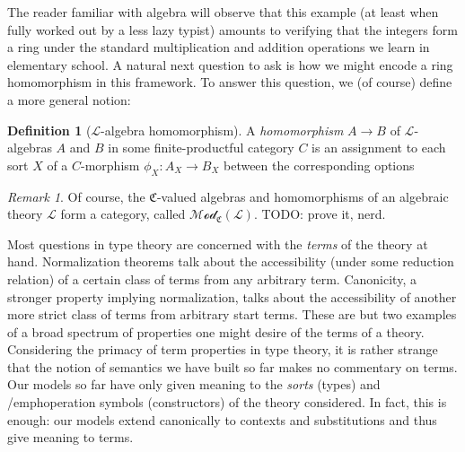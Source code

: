 \documentclass[12pt,twoside]{reedthesis}
\theoremstyle{definition}
\newtheorem{definition}{Definition}
\theoremstyle{remark}
\newtheorem{remark}{Remark}
\theoremstyle{plain}
\begin{document}
The reader familiar with algebra will observe that this example (at least when
fully worked out by a less lazy typist) amounts to verifying that the integers
form a ring under the standard multiplication and addition operations we learn
in elementary school. A natural next question to ask is how we might encode a
ring homomorphism in this framework. To answer this question, we (of course)
define a more general notion:

\begin{definition}[$\mathcal{L}$-algebra homomorphism]\label{def:homomorphism}
  A \emph{homomorphism} \( A \rightarrow B\) of $\mathcal{L}$-algebras $A$ and $B$ in some
  finite-productful category $C$ is an assignment to each sort $X$ of a
  $C$-morphism \( \phi_{X} : A_{X} \rightarrow B_{X}\) between the corresponding options
\end{definition}

\begin{remark}
  Of course, the $\mathfrak{C}$-valued algebras and homomorphisms of an algebraic
  theory $\mathcal{L}$ form a category, called
  $\mathscr{Mod}_{\mathfrak{C}}(\mathcal{L})$. TODO: prove it, nerd.
\end{remark}

Most questions in type theory are concerned with the \emph{terms} of the theory
at hand. Normalization theorems talk about the accessibility (under some
reduction relation) of a certain class of terms from any arbitrary term.
Canonicity, a stronger property implying normalization, talks about the
accessibility of another more strict class of terms from arbitrary start terms.
These are but two examples of a broad spectrum of properties one might desire of
the terms of a theory. Considering the primacy of term properties in type
theory, it is rather strange that the notion of semantics we have built so far
makes no commentary on terms. Our models so far have only given meaning to the
\emph{sorts} (types) and /emph{operation symbols} (constructors) of the theory
considered. In fact, this is enough: our models extend canonically to contexts
and substitutions and thus give meaning to terms.

\DeclarePairedDelimiter{\sem}{\llbracket}{\rrbracket}
\end{document}

